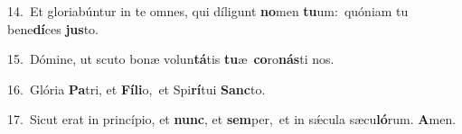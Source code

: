 {\numbfont\textcolor{\numbcolor}{14.}}~Et gloriabúntur in te omnes, qui díligunt \textbf{no}\-men \textbf{tu}\-um:~\star quóniam tu bene\-\textbf{dí}\-ces \textbf{jus}\-to.\par
{\numbfont\textcolor{\numbcolor}{15.}}~Dómine, ut scuto bonæ volun\-\textbf{tá}\-tis \textbf{tu}\-æ~\star \textbf{co}\-ro\-\textbf{nás}\-ti nos.\par
{\numbfont\textcolor{\numbcolor}{16.}}~Glória \textbf{Pa}\-tri, et \textbf{Fí}\-\textbf{li}o,~\star et Spi\-\textbf{rí}\-tui \textbf{Sanc}\-to.\par
{\numbfont\textcolor{\numbcolor}{17.}}~Sicut erat in princípio, et \textbf{nunc}\-, et \textbf{sem}\-per,~\star et in sǽcula sæcu\-\textbf{ló}\-rum. \textbf{A}\-men.\par
